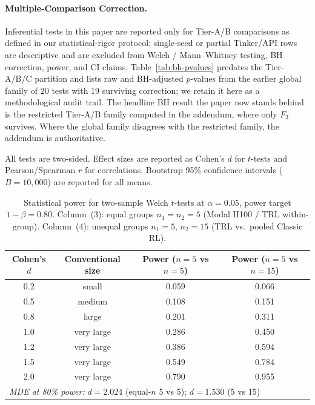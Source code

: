 \documentclass{article}
\begin{document}
\paragraph{Multiple-Comparison Correction.}
Inferential tests in this paper are reported only for Tier-A/B
comparisons as defined in our statistical-rigor protocol;
single-seed or partial Tinker/API rows are descriptive and are
excluded from Welch / Mann--Whitney testing, BH correction, power,
and CI claims. Table~\ref{tab:bh-pvalues} predates the Tier-A/B/C
partition and lists raw and BH-adjusted $p$-values from the
earlier global family of $20$ tests with $19$ surviving correction;
we retain it here as a methodological audit trail. The headline
BH result the paper now stands behind is the restricted Tier-A/B
family computed in the addendum, where only $F_3$ survives. Where
the global family disagrees with the restricted family, the
addendum is authoritative.

All tests are two-sided.  Effect sizes are reported as Cohen's $d$ for
$t$-tests and Pearson/Spearman $r$ for correlations.  Bootstrap 95\%
confidence intervals ($B = 10{,}000$) are reported for all means.

\begin{table}[!ht]
\centering
\caption{Statistical power for two-sample Welch $t$-tests at $\alpha = 0.05$,
         power target $1{-}\beta = 0.80$.
         Column~(3): equal groups $n_1 = n_2 = 5$ (Modal H100 / TRL within-group).
         Column~(4): unequal groups $n_1 = 5$, $n_2 = 15$ (TRL vs.\ pooled Classic RL).}
\label{tab:power-analysis}
\small
\begin{tabular}{@{}cccc@{}}
\toprule
Cohen's $d$ & Conventional size & Power ($n{=}5$ vs $n{=}5$) & Power ($n{=}5$ vs $n{=}15$) \\
\midrule
        0.2 & small & 0.059 & 0.066 \\
        0.5 & medium & 0.108 & 0.151 \\
        0.8 & large & 0.201 & 0.311 \\
        1.0 & very large & 0.286 & 0.450 \\
        1.2 & very large & 0.386 & 0.594 \\
        1.5 & very large & 0.549 & 0.784 \\
        2.0 & very large & 0.790 & 0.955 \\
\midrule
\multicolumn{4}{l}{\textit{MDE at 80\% power:} $d = 2.024$ (equal-$n$ 5 vs 5);\; $d = 1.530$ (5 vs 15)} \\
\bottomrule
\end{tabular}
\end{table}
\end{document}
